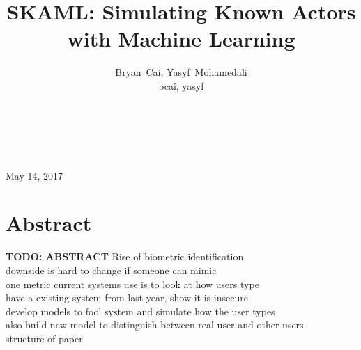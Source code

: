 \documentclass{amsart}
\title{SKAML: Simulating Known Actors with Machine Learning}
\author{Bryan~Cai, Yasyf~Mohamedali\\ \MakeLowercase{bcai, yasyf}}
\begin{document}
\begin{titlepage}
\centering
~
\vspace{7 cm}
\maketitle
~\\
May 14, 2017
\vfill

\end{titlepage}

\section{Abstract}
\textbf{TODO: ABSTRACT}
Rise of biometric identification \\
downside is hard to change if someone can mimic \\
one metric current systems use is to look at how users type \\
have a existing system from last year, show it is insecure \\
develop models to fool system and simulate how the user types \\
also build new model to distinguish between real user and other users \\
structure of paper \\
\end{document}
